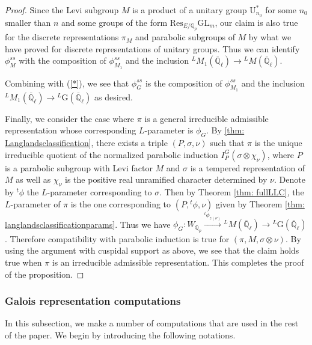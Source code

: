 \documentclass[reqno,11pt]{amsart}
\theoremstyle{remark}
\newcommand{\G}{\mathrm{G}}
\newcommand{\U}{\mathrm{U}}
\newcommand{\Res}{\mathrm{Res}}
\newcommand{\GL}{\mathrm{GL}}
\newcommand{\Q}{\mathbb{Q}}
\newcommand{\ov}{\overline}
\begin{document}
\begin{proof}
Since the Levi subgroup $M$ is a product of a unitary group $\U^*_{n_0}$ for some $n_0$ smaller than $n$ and some groups of the form $\Res_{E/\Q_p} \GL_m$, our claim is also true for the discrete representations $\pi_M$ and parabolic subgroups of $M$ by what we have proved for discrete representations of unitary groups. Thus we can identify $\phi_M^{ss}$ with the composition of $ \phi_{M_1}^{ss} $ and the inclusion $\phantom{}^{L}M_1(\ov{\Q}_{\ell}) \rightarrow \phantom{}^{L}M(\ov{\Q}_{\ell})$. 

Combining with (\ref{*}), we see that $\phi_G^{ss}$ is the composition of $\phi_{M_1}^{ss}$ and the inclusion $\phantom{}^{L}M_1(\ov{\Q}_{\ell}) \rightarrow \phantom{}^{L}\G(\ov{\Q}_{\ell})$ as desired.

Finally, we consider the case where $\pi$ is a general irreducible admissible representation whose corresponding $L$-parameter is $\phi_G$. By \ref{thm: Langlandsclassification}, there exists a triple $(P, \sigma, \nu)$ such that $\pi$ is the unique irreducible quotient of the normalized parabolic induction $I^G_P(\sigma \otimes \chi_{\nu})$, where $P$ is a parabolic subgroup with Levi factor $M$ and $\sigma$ is a tempered representation of $M$ as well as $\chi_{\nu}$ is the positive real unramified character determined by $\nu$. Denote by ${}^t\phi$ the $L$-parameter corresponding to $\sigma$. Then by Theorem \ref{thm: fullLLC}, the $L$-parameter of $\pi$ is the one corresponding to $(P, {}^t\phi , \nu)$ given by Theorem \ref{thm: langlandsclassificationparams}. Thus we have $ \phi_G : W_{\Q_p} \xrightarrow{ {}^t\phi_{z(\nu)} } \phantom{}^{L}M(\ov{\Q}_{\ell}) \rightarrow \phantom{}^{L}\G(\ov{\Q}_{\ell})$. Therefore compatibility with parabolic induction is true for $(\pi, M, \sigma \otimes \nu )$. By using the argument with cuspidal support as above, we see that the claim holds true when $\pi$ is an irreducible admissible representation. This completes the proof of the proposition.
\end{proof}
\subsubsection{Galois representation computations}{\label{sss: galoisrepcomp}}
In this subsection, we make a number of computations that are used in the rest of the paper. We begin by introducing the following notations.
\end{document}
